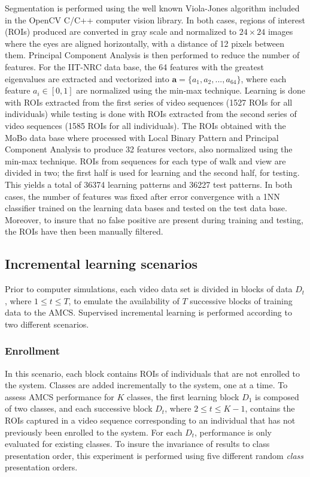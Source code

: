 Segmentation is performed using the well known Viola-Jones algorithm included in the OpenCV C/C++ computer vision library.
In both cases, regions of interest (ROIs) produced are converted in gray scale and normalized to $24\times24$ images where the eyes are aligned horizontally, with a distance of 12 pixels between them.
Principal Component Analysis is then performed to reduce the number of features.
For the IIT-NRC data base, the 64 features with the greatest eigenvalues are extracted and vectorized into $\textbf{a} = \{a_1, a_2, ..., a_{64}\}$, where each feature $a_i \in [0,1]$ are normalized using the min-max technique.
Learning is done with ROIs extracted from the first series of video sequences (1527 ROIs for all individuals) while testing is done with ROIs extracted from the second series of video sequences (1585 ROIs for all individuals).
The ROIs obtained with the MoBo data base where processed with Local Binary Pattern and Principal Component Analysis to produce 32 features vectors, also normalized using the min-max technique.
ROIs from sequences for each type of walk and view are divided in two; the first half is used for learning and the second half, for testing.
This yields a total of 36374 learning patterns and 36227 test patterns.
In both cases, the number of features was fixed after error convergence with a 1NN classifier trained on the learning data bases and tested on the test data base.
Moreover, to insure that no false positive are present during training and testing, the ROIs have then been manually filtered.

\subsection{Incremental learning scenarios}
\label{sec:c3_scenario}

Prior to computer simulations, each video data set is divided in blocks of data $D_t$, where $1\leq t\leq T$, to emulate the availability of $T$ successive blocks of training data to the AMCS.
Supervised incremental learning is performed according to two different scenarios.

\subsubsection{Enrollment}

In this scenario, each block contains ROIs of individuals that are not enrolled to the system.
Classes are added incrementally to the system, one at a time.
To assess AMCS performance for $K$ classes, the first learning block $D_1$ is composed of two classes, and each successive block $D_t$, where $2 \leq t \leq K-1$, contains the ROIs captured in a video sequence corresponding to an individual that has not previously been enrolled to the system.
For each $D_t$, performance is only evaluated for existing classes.
To insure the invariance of results to class presentation order, this experiment is performed using five different random \emph{class} presentation orders.

